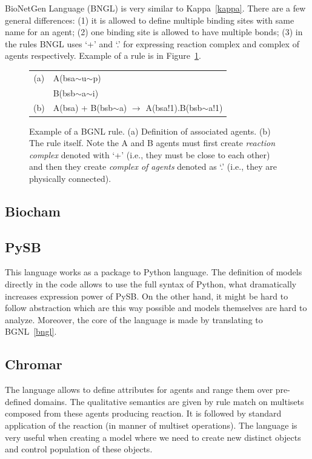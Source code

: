 \documentclass[12pt]{fithesis2}
\begin{document}
BioNetGen Language (BNGL) is very similar to Kappa~\ref{kappa}. There are a few general differences: (1) it is allowed to define multiple binding sites with same name for an agent; (2) one binding site is allowed to have multiple bonds; (3) in the rules BNGL uses `+' and `.' for expressing reaction complex and complex of agents respectively. Example of a rule is in Figure~\ref{bngl-rule}.

\begin{figure}
\begin{center}
\begin{tabular}{c l}
(a) & A(bsa$\sim$u$\sim$p) \\
  & B(bsb$\sim$a$\sim$i) \\
(b) & A(bsa) + B(bsb$\sim$a) $\rightarrow$ A(bsa!1).B(bsb$\sim$a!1) \\
\end{tabular}
\end{center}
\caption{Example of a BGNL rule. (a) Definition of associated agents. (b) The rule itself. Note the A and B agents must first create \emph{reaction complex} denoted with `+' (i.e., they must be close to each other) and then they create \emph{complex of agents} denoted as `.' (i.e., they are physically connected).}\label{bngl-rule}
\end{figure}

\subsection{Biocham}

\subsection{PySB}

This language works as a package to Python language. The definition of models directly in the code allows to use the full syntax of Python, what dramatically increases expression power of PySB. On the other hand, it might be hard to follow abstraction which are this way possible and models themselves are hard to analyze. Moreover, the core of the language is made by translating to BGNL~\ref{bngl}.

\subsection{Chromar}

The language allows to define attributes for agents and range them over pre-defined domains. The qualitative semantics are given by rule match on multisets composed from these agents producing reaction. It is followed by standard application of the reaction (in manner of multiset operations). The language is very useful when creating a model where we need to create new distinct objects and control population of these objects.
\end{document}
